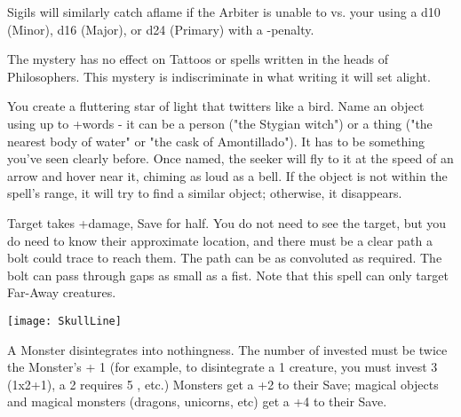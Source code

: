 Sigils will similarly catch aflame if the Arbiter is unable to \RB vs. your \FOC using a d10 (Minor), d16 (Major), or d24 (Primary) with a -\DICE penalty.

The mystery has no effect on Tattoos or spells written in the heads of Philosophers.  This mystery is indiscriminate in what writing it will set alight.


\MYSTERY [
  Name = Sonorous Seeker,
  Link = arcana-mystery-sonorous-seeker,
  Paradigm = Prophesy,
  Save = N,
  Duration = \SUM Minutes,
  Target = See Below
]

You create a fluttering star of light that twitters like a bird.  Name an object using up to \DICE+\DICE words - it can be a person ("the Stygian witch") or a thing ("the nearest body of water" or "the cask of Amontillado").  It has to be something you've seen clearly before.  Once named, the seeker will fly to it at the speed of an arrow and hover near it, chiming as loud as a bell.  If the object is not within the spell's range, it will try to find a similar object; otherwise, it disappears.


\MYSTERY [
  Name = Doombolt,
  Link = arcana-mystery-doombolt,
  Paradigm = Force,
  Save = Y (half),
  Duration = Instant,
  Target = Far-Away Target(s)
]

Target takes \SUMDICE+\DICE damage, Save for half. You do not need to see the target, but you do need to know their approximate location, and there must be a clear path a bolt could trace to reach them. The path can be as convoluted as required. The bolt can pass through gaps as small as a fist.  Note that this spell can only target Far-Away creatures.

  \begin{center}
  \texttt{[image: SkullLine]}
  \end{center}



\MYSTERY [
  Name = Gaze of the Void,
  Link = arcana-mystery-gaze-of-the-void,
  Paradigm = Entropy,
  Save = Y (neg.),
  Duration = Instant,
  Target = Nearby or Far-Away Target(s)
]

A Monster disintegrates into nothingness. The number of \DICE invested must be twice the Monster's \HD + 1 (for example, to disintegrate a 1 \HD creature, you must invest 3 \DICE (1x2+1), a 2 \HD requires 5 \DICE, etc.) Monsters get a +2 to their Save; magical objects and magical monsters (dragons, unicorns, etc) get a +4 to their Save.



